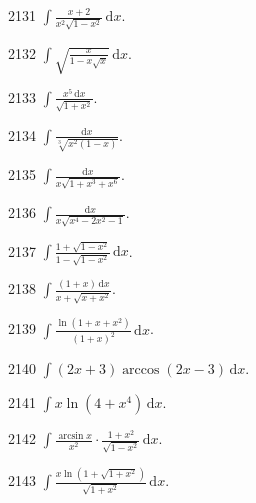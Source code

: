 \begin{prob}[S]{2131}
$\int \frac{x + 2}{x^2 \sqrt{1 - x^2}} \,\mathrm{d}x$.
\end{prob}

\begin{prob}[S]{2132}
$\int \sqrt{\frac{x}{1 - x\sqrt{x}}} \,\mathrm{d}x$.
\end{prob}

\begin{prob}[S]{2133}
$\int \frac{x^5 \,\mathrm{d}x}{\sqrt{1 + x^2}}$.
\end{prob}

\begin{prob}[S]{2134}
$\int \frac{\mathrm{d}x}{\sqrt[3]{x^2(1 - x)}}$.
\end{prob}

\begin{prob}[S]{2135}
$\int \frac{\mathrm{d}x}{x\sqrt{1 + x^3 + x^6}}$.
\end{prob}

\begin{prob}[S]{2136}
$\int \frac{\mathrm{d}x}{x\sqrt{x^4 - 2x^2 - 1}}$.
\end{prob}

\begin{prob}[S]{2137}
$\int \frac{1 + \sqrt{1 - x^2}}{1 - \sqrt{1 - x^2}} \,\mathrm{d}x$.
\end{prob}

\begin{prob}[S]{2138}
$\int \frac{(1 + x) \,\mathrm{d}x}{x + \sqrt{x + x^2}}$.
\end{prob}

\begin{prob}[S]{2139}
$\int \frac{\ln(1 + x + x^2)}{(1 + x)^2} \,\mathrm{d}x$.
\end{prob}

\begin{prob}[S]{2140}
$\int (2x + 3)\arccos(2x - 3) \,\mathrm{d}x$.
\end{prob}

\begin{prob}[S]{2141}
$\int x \ln(4 + x^4) \,\mathrm{d}x$.
\end{prob}

\begin{prob}[S]{2142}
$\int \frac{\arcsin x}{x^2} \cdot \frac{1 + x^2}{\sqrt{1 - x^2}} \,\mathrm{d}x$.
\end{prob}

\begin{prob}[S]{2143}
$\int \frac{x \ln(1 + \sqrt{1 + x^2})}{\sqrt{1 + x^2}} \,\mathrm{d}x$.
\end{prob}

